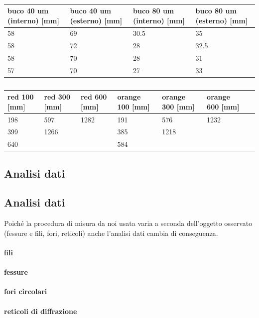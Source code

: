 \begin{table}
    \centering
    \footnotesize
    \begin{tabular}{l l l l}
        \toprule
        buco 40 um (interno) [mm]&      buco 40 um (esterno) [mm]&      buco 80 um (interno) [mm]&      buco 80 um (esterno) [mm]\\
        \midrule
        58&                             69&                             30.5&                           35\\
        58&                             72&                             28&                             32.5\\
        58&                             70&                             28&                             31\\
        57&                             70&                             27&                             33\\
        \bottomrule
    \end{tabular}
    \caption{}
    \label{tab:foro}
\end{table}

\begin{table}
    \centering
    \footnotesize
    \begin{tabular}{l l l l l l l}
        \toprule
        red 100 [mm]&   red 300 [mm]&   red 600 [mm]&   orange 100 [mm]&    orange 300 [mm]&    orange 600 [mm]&\\
        \midrule
        198&            597&            1282&           191&                576&                1232&\\
        399&            1266&           &              385&                1218&               &\\
        640&            &              &              584&                &                  &\\
        \bottomrule
    \end{tabular}
    \caption{}
    \label{tab:reticolo}
\end{table}

\subsection{Analisi dati}


\subsection{Analisi dati}
Poiché la procedura di misura da noi usata varia a seconda dell'oggetto osservato (fessure e fili, fori, reticoli) anche l'analisi dati cambia di conseguenza.

\paragraph{fili}
\paragraph{fessure}
\paragraph{fori circolari}
\paragraph{reticoli di diffrazione}
